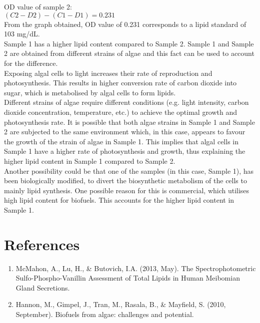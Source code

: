 \documentclass[11.5pt,a4paper]{IEEEtran}
\begin{document}
    OD value of sample 2: \\
    
    $(C2-D2)-(C1-D1) = 0.231$ \\
    
    From the graph obtained, OD value of 0.231 corresponds to a lipid standard of 103 mg/dL. \\
    
    Sample 1 has a higher lipid content compared to Sample 2. Sample 1 and Sample 2 are obtained from different strains of algae and this fact can be used to account for the difference. \\
    
    Exposing algal cells to light increases their rate of reproduction and photosynthesis. This results in higher conversion rate of carbon dioxide into sugar, which is metabolised by algal cells to form lipids. \\
    
    Different strains of algae require different conditions (e.g. light intensity, carbon dioxide concentration, temperature, etc.) to achieve the optimal growth and photosynthesis rate. It is possible that both algae strains in Sample 1 and Sample 2 are subjected to the same environment which, in this case, appears to favour the growth of the strain of algae in Sample 1. This implies that algal cells in Sample 1 have a higher rate of photosynthesis and growth, thus explaining the higher lipid content in Sample 1 compared to Sample 2. \\
    
    Another possibility could be that one of the samples (in this case, Sample 1), has been biologically modified, to divert the biosynthetic metabolism of the cells to mainly lipid synthesis. One possible reason for this is commercial, which utilises high lipid content for biofuels. This accounts for the higher lipid content in Sample 1.
    
    \section{References}
    \begin{enumerate}
    	\item McMahon, A., Lu, H., \& Butovich, I.A. (2013, May). The Spectrophotometric Sulfo-Phospho-Vanillin Assessment of Total Lipids in Human Meibomian Gland Secretions.
    	\item Hannon, M., Gimpel, J., Tran, M., Rasala, B., \& Mayfield, S. (2010, September). Biofuels from algae: challenges and potential.
    \end{enumerate}
\end{document}
